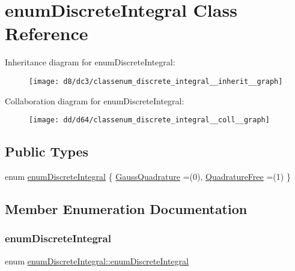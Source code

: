 \hypertarget{classenum_discrete_integral}{}\section{enum\+Discrete\+Integral Class Reference}
\label{classenum_discrete_integral}


Inheritance diagram for enum\+Discrete\+Integral\+:
\nopagebreak
\begin{figure}[H]
\begin{center}
\leavevmode
\texttt{[image: d8/dc3/classenum\_discrete\_integral\_\_inherit\_\_graph]}
\end{center}
\end{figure}


Collaboration diagram for enum\+Discrete\+Integral\+:
\nopagebreak
\begin{figure}[H]
\begin{center}
\leavevmode
\texttt{[image: dd/d64/classenum\_discrete\_integral\_\_coll\_\_graph]}
\end{center}
\end{figure}
\subsection*{Public Types}
\begin{DoxyCompactItemize}
\item 
enum \hyperlink{classenum_discrete_integral_ad100f57311fcc2101c62f69474c42a90}{enum\+Discrete\+Integral} \{ \hyperlink{classenum_discrete_integral_ad100f57311fcc2101c62f69474c42a90a26a8b37b23d7fd9310ed0916cb57dd36}{Gauss\+Quadrature} =(0), 
\hyperlink{classenum_discrete_integral_ad100f57311fcc2101c62f69474c42a90a06de0804a59c311e0e31c0cd8abc5db5}{Quadrature\+Free} =(1)
 \}
\end{DoxyCompactItemize}


\subsection{Member Enumeration Documentation}
\mbox{\label{classenum_discrete_integral_ad100f57311fcc2101c62f69474c42a90}} 
\subsubsection{\texorpdfstring{enum\+Discrete\+Integral}{enumDiscreteIntegral}}
{\footnotesize\ttfamily enum \hyperlink{classenum_discrete_integral_ad100f57311fcc2101c62f69474c42a90}{enum\+Discrete\+Integral\+::enum\+Discrete\+Integral}}

